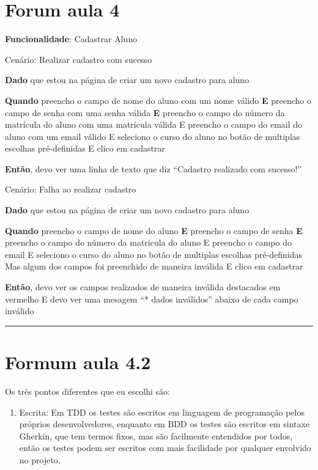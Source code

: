 \documentclass[11pt]{article}
\author{Diogo}
\date{\today}
\title{}
\begin{document}
\tableofcontents

\section{Forum aula 4}
\label{sec:org87a3cc9}

\textbf{Funcionalidade}: Cadastrar Aluno

Cenário: Realizar cadastro com sucesso

\textbf{Dado} que estou na página de criar um novo cadastro para aluno

\textbf{Quando} preencho o campo de nome do aluno com um nome válido
\textbf{E} preencho o campo de senha com uma senha válida
\textbf{E} preencho o campo do número da matrícula do aluno com uma matrícula válida
E preencho o campo do email do aluno com um email válido
E seleciono o curso do aluno no botão de multiplas escolhas pré-definidas
E clico em cadastrar

\textbf{Então}, devo ver uma linha de texto que diz ``Cadastro realizado com sucesso!''

Cenário: Falha ao realizar cadastro

\textbf{Dado} que estou na página de criar um novo cadastro para aluno

\textbf{Quando} preencho o campo de nome do aluno
\textbf{E} preencho o campo de senha
\textbf{E} preencho o campo do número da matrícula do aluno
E preencho o campo do email
E seleciono o curso do aluno no botão de multiplas escolhas pré-definidas
Mas algum dos campos foi preenchido de maneira inválida
E clico em cadastrar

\textbf{Então}, devo ver os campos realizados de maneira inválida destacados em vermelho
E devo ver uma mesagem ``* dados inválidos'' abaixo de cada campo inválido

\noindent\rule{\textwidth}{0.5pt}

\section{Formum aula 4.2}
\label{sec:org3ac5afb}

Os três pontos diferentes que eu escolhi são:

\begin{enumerate}
\item Escrita: Em TDD os testes são escritos em linguagem de programação pelos próprios desenvolvedores, enquanto em BDD os testes são escritos em sintaxe Gherkin, que tem termos fixos, mas são facilmente entendidos por todos, então os testes podem ser escritos com mais facilidade por qualquer envolvido no projeto.
\end{enumerate}
\end{document}
